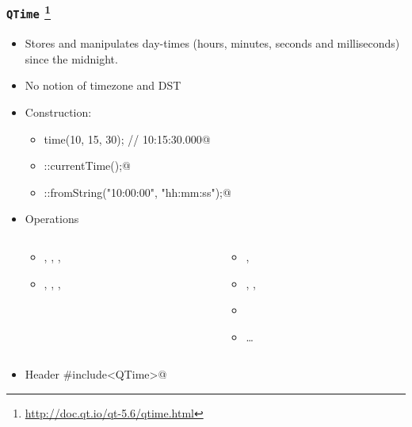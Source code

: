 \begin{frame}[fragile]
  \frametitle{\texttt{QTime}
    \footnote{\url{http://doc.qt.io/qt-5.6/qtime.html}}}
  \begin{itemize}
    \item Stores and manipulates day-times (hours, minutes, seconds and
      milliseconds) since the midnight.
    \item No notion of timezone and DST
    \item Construction:
    \begin{itemize}
      \footnotesize
      \item \verb@QTime time(10, 15, 30); // 10:15:30.000@
      \item \verb@QTime::currentTime();@
      \item \verb@QTime::fromString("10:00:00", "hh:mm:ss");@
    \end{itemize}
    \item Operations
    \begin{columns}
      \scriptsize
      \begin{column}{0.4\textwidth}
      \begin{itemize}
        \item \verb@hour@, \verb@minute@, \verb@second@, \verb@msec@
        \item \verb@addHours@, \verb@addMinutes@, \verb@addSecs@, \verb@addMSecs@
      \end{itemize}
      \end{column}
      \begin{column}{0.4\textwidth}
      \begin{itemize}
        \item \verb@isValid@, \verb@isNull@
        \item \verb@start@, \verb@restart@, \verb@elapsed@
        \item \verb@toString@
        \item \ldots
      \end{itemize}
      \end{column}
    \end{columns}
    \item Header \verb@#include<QTime>@
  \end{itemize}
\end{frame}

